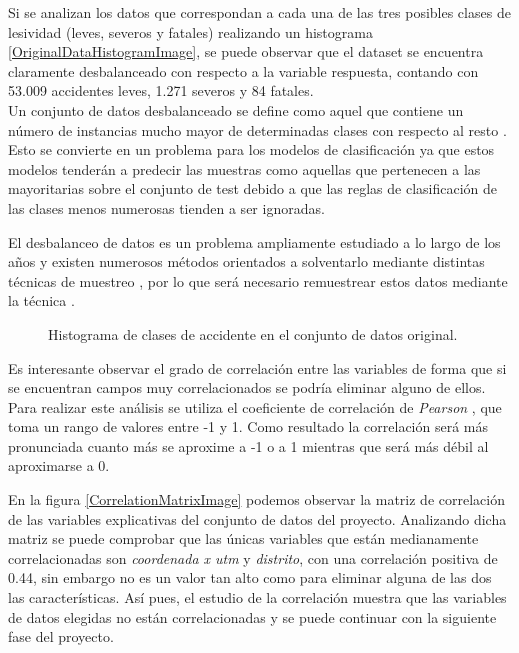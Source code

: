 \begin{enumerate}
                    Si se analizan los datos que correspondan a cada una de las tres posibles clases de lesividad (leves, severos y fatales) realizando un histograma \eqref{OriginalDataHistogramImage}, se puede observar que el dataset se encuentra claramente desbalanceado con respecto a la variable respuesta, contando con 53.009 accidentes leves, 1.271 severos y 84 fatales.\\

                    Un conjunto de datos desbalanceado se define como aquel que contiene un número de instancias mucho mayor de determinadas clases con respecto al resto \cite{WhyImbalancedDataIsAProblem}. Esto se convierte en un problema para los modelos de clasificación ya que estos modelos tenderán a predecir las muestras como aquellas que pertenecen a las mayoritarias sobre el conjunto de test debido a que las reglas de clasificación de las clases menos numerosas tienden a ser ignoradas.

                    El desbalanceo de datos es un problema ampliamente estudiado a lo largo de los años y existen numerosos métodos orientados a solventarlo mediante distintas técnicas de muestreo \cite{ImbalancedDataReview}, por lo que será necesario remuestrear estos datos mediante la técnica .


                    \begin{figure}[H]
                        \centering
                        
                        \caption{Histograma de clases de accidente en el conjunto de datos original.}
                        \label{OriginalDataHistogramImage}
                     \end{figure}

                    Es interesante observar el grado de correlación entre las variables de forma que si se encuentran campos muy correlacionados se podría eliminar alguno de ellos. Para realizar este análisis se utiliza el coeficiente de correlación de \textit{Pearson} \cite{PearsonCoefficientCorrelationMatrix}, que toma un rango de valores entre -1 y 1. Como resultado la correlación será más pronunciada cuanto más se aproxime a -1 o a 1 mientras que será más débil al aproximarse a 0.

                    En la figura \eqref{CorrelationMatrixImage} podemos observar la matriz de correlación de las variables explicativas del conjunto de datos del proyecto. Analizando dicha matriz se puede comprobar que las únicas variables que están medianamente correlacionadas son \textit{coordenada x utm} y \textit{distrito}, con una correlación positiva de 0.44, sin embargo no es un valor tan alto como para eliminar alguna de las dos las características. Así pues, el estudio de la correlación muestra que las variables de datos elegidas no están correlacionadas y se puede continuar con la siguiente fase del proyecto.


\end{enumerate}

